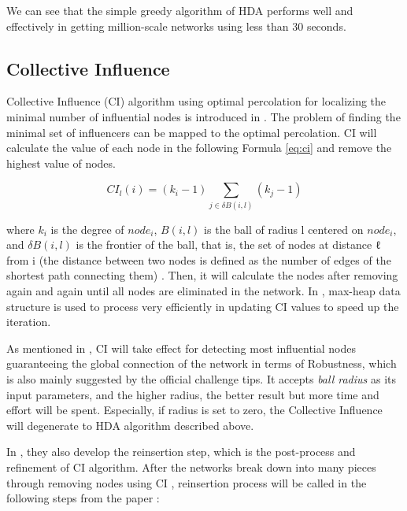 \documentclass{article}
\begin{document}
	We can see that the simple greedy algorithm of HDA performs well and effectively in getting million-scale networks using less than 30 seconds. 


	\subsection{Collective Influence}		

	Collective Influence (CI) algorithm using optimal percolation for localizing the minimal number of influential nodes is introduced in \cite{morone2015influence} \cite{morone2016collective}. The problem of finding the minimal set of influencers can be mapped to the optimal percolation. CI will calculate the value of each node in the following Formula \ref{eq:ci}  and remove the highest value of nodes. 
	
	\begin{equation} \label{eq:ci}
		CI_l(i)=(k_i-1)\sum_{j\in\delta B(i,l)} (k_j-1)
	\end{equation}
	
	where $k_i$ is the degree of $node_i$, $B(i,l)$ is the ball of radius l centered on $node_i$, and $\delta B(i,l)$ is the frontier of the ball, that is, the set of nodes at distance ℓ from i (the distance between two nodes is defined as the number of edges of the shortest path connecting them) \cite{morone2016collective} . Then, it will calculate the nodes after removing again and again until all nodes are eliminated in the network. In \cite{morone2016collective},  max-heap data structure is used to process very efficiently in updating CI values to speed up the iteration. 
	
	As mentioned in \cite{lu2016vital}, CI will take effect for detecting most influential nodes guaranteeing the global connection of the network in terms of Robustness, which is also mainly suggested by the official challenge tips. It accepts \textit{ball radius} as its input parameters, and the higher radius, the better result but more time and effort will be spent. Especially, if radius is set to zero, the Collective Influence will degenerate to HDA algorithm described above.
	
	In \cite{morone2015influence} \cite{morone2016collective}, they also develop the reinsertion step, which is the post-process and  refinement of CI algorithm. After the networks break down into many pieces through removing nodes using CI , reinsertion process will be called in the following steps from the paper \cite{morone2016collective} : 
	
\end{document}

